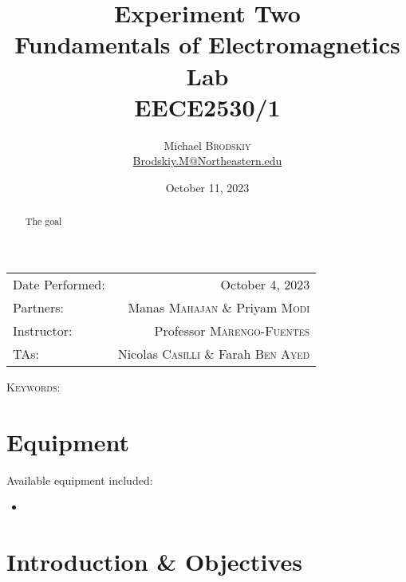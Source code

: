 \documentclass[
	letterpaper, %
	10pt, %
]{CSUniSchoolLabReport}
\title{Experiment Two\\ Fundamentals of Electromagnetics Lab \\ EECE2530/1} %
\author{Michael \textsc{Brodskiy}\\ \small \href{mailto:Brodskiy.M@Northeastern.edu}{Brodskiy.M@Northeastern.edu}}
\date{October 11, 2023} %
\begin{document}
\maketitle %

\begin{center}
	\begin{tabular}{l r}
		Date Performed: & October 4, 2023 \\ %
        Partners: & Manas \textsc{Mahajan} \& Priyam \textsc{Modi} \\ %
		Instructor: & Professor \textsc{Marengo-Fuentes} \\ %
        TAs: & Nicolas \textsc{Casilli} \& Farah \textsc{Ben Ayed} \\ %
	\end{tabular}
\end{center}

\newpage

\begin{abstract}

  The goal

\end{abstract}

\begin{flushleft}

  \textsc{Keywords:} 

\end{flushleft}

\newpage

\section{Equipment}

\hspace{.5 in} Available equipment included:\\

\begin{itemize}

  \item 

\end{itemize}

\section{Introduction \& Objectives}

\newpage
\end{document}
